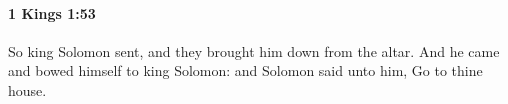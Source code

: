 
		\paragraph{1 Kings 1:53} %
			\label{1KINGS-1-53}

			So king Solomon sent, and they brought him down from the altar. And he came and bowed himself to king Solomon: and Solomon said unto him, Go to thine house.

